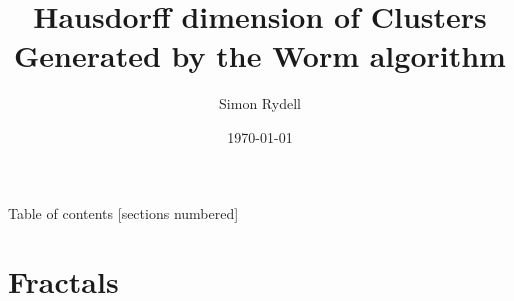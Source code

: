 \documentclass[10pt]{beamer}
\title{Hausdorff dimension of Clusters Generated by the Worm algorithm}
\date{\today}
\date{}
\author{Simon Rydell}
\institute{Royal Institute of Technology, Stockholm}
\begin{document}
\maketitle

\begin{frame}{Table of contents}
  [sections numbered]
  \tableofcontents[hideallsubsections]
\end{frame}

\section{Fractals}



\end{document}
